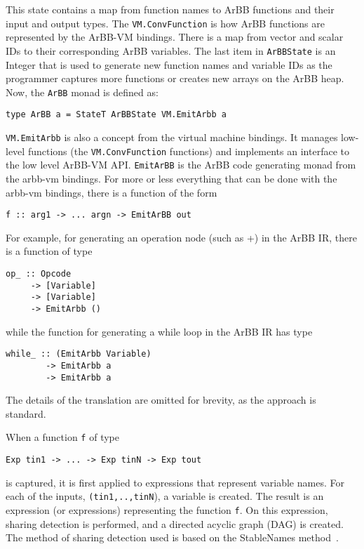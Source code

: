 This state contains a map from function names to ArBB functions and their input and 
output types. The {\tt VM.ConvFunction} is how ArBB functions are represented by 
the ArBB-VM bindings. There is a map from vector and scalar IDs to their 
corresponding ArBB variables. The last item in {\tt ArBBState} is an Integer 
that is used to generate new function names and variable IDs as the programmer 
captures more functions or creates new arrays on the ArBB heap. 
Now, the {\tt ArBB} monad is defined as: 

\begin{verbatim}
type ArBB a = StateT ArBBState VM.EmitArbb a  
\end{verbatim}

{\tt VM.EmitArbb} is also a concept from the virtual machine bindings. It manages 
low-level functions (the {\tt VM.ConvFunction} functions) and implements an interface to 
the low level ArBB-VM API. 
{\tt EmitArBB} is the ArBB code generating monad from the arbb-vm bindings.
For more or less everything that can be done with the arbb-vm bindings, there is a function
of the form 
\begin{verbatim}
f :: arg1 -> ... argn -> EmitArBB out
\end{verbatim}
For example, for generating an operation node (such as +) in the ArBB IR, there is a
function of type
\begin{verbatim}
op_ :: Opcode 
     -> [Variable] 
     -> [Variable] 
     -> EmitArbb ()
\end{verbatim}
\noindent
while the function for generating a while loop in the ArBB IR has type
\begin{verbatim}
while_ :: (EmitArbb Variable) 
        -> EmitArbb a 
        -> EmitArbb a
\end{verbatim}
The details of the translation are omitted for brevity, as the approach is
standard.

When a function {\tt f} of type 
\begin{verbatim}
Exp tin1 -> ... -> Exp tinN -> Exp tout
\end{verbatim}
is captured, it is 
first applied to expressions that represent variable names. For each of the 
inputs, {\tt (tin1,..,tinN}), a variable is created. The result is an expression 
(or expressions) representing the function {\tt f}. On this expression, sharing 
detection is performed, and a directed acyclic graph (DAG) is created. 
The method of sharing detection used is based on the StableNames method~. 

